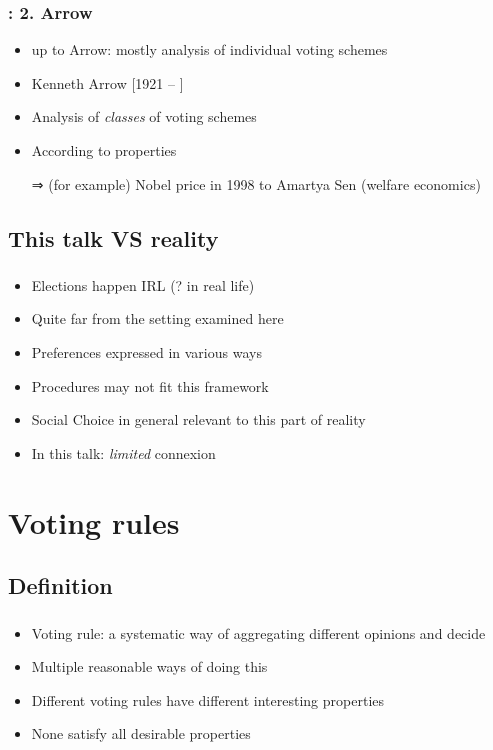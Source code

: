 \documentclass[french, english]{beamer}
\begin{document}
\begin{frame}
	\frametitle{\subsecname: 2. Arrow}
	\begin{itemize}
		\item up to Arrow: mostly analysis of individual voting schemes
		\item Kenneth Arrow [1921 – ]
		\item Analysis of \emph{classes} of voting schemes
		\item According to properties
		\item[⇒] {\tiny (for example)} Nobel price in 1998 to Amartya Sen (welfare economics)
	\end{itemize}
\end{frame}

\subsection{This talk VS reality}
\begin{frame}
	\frametitle{\subsecname}
	\begin{itemize}
		\item Elections happen IRL (? \pause in real life) \pause
		\item Quite far from the setting examined here
		\item Preferences expressed in various ways
		\item Procedures may not fit this framework
		\item Social Choice in general relevant to this part of reality
		\item In this talk: \emph{limited} connexion
	\end{itemize}
\end{frame}

\section{Voting rules}
\subsection{Definition}
\begin{frame}
	\frametitle{\subsecname}
	\begin{itemize}
		\item Voting rule: a systematic way of aggregating different opinions and decide
		\item Multiple reasonable ways of doing this
		\item Different voting rules have different interesting properties
		\item None satisfy all desirable properties
	\end{itemize}
\end{frame}
\end{document}
